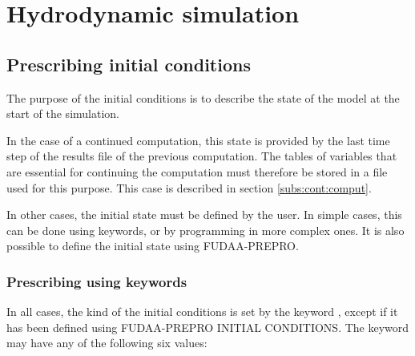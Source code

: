 \chapter{Hydrodynamic simulation}
\label{ch:hydrod:sim}

\section{Prescribing initial conditions}

The purpose of the initial conditions is to describe the state of the model
at the start of the simulation.

In the case of a continued computation, this state is provided by the last time
step of the results file of the previous computation.
The tables of variables that are essential for continuing the computation
must therefore be stored in a file used for this purpose.
This case is described in section \ref{subs:cont:comput}.

In other cases, the initial state must be defined by the user.
In simple cases, this can be done using keywords, or by programming in more
complex ones.
It is also possible to define the initial state using FUDAA-PREPRO.


\subsection{Prescribing using keywords}

In all cases, the kind of the initial conditions is set by the keyword
, except if it has been defined using
FUDAA-PREPRO INITIAL CONDITIONS.
The keyword  may have any of the following six values:

